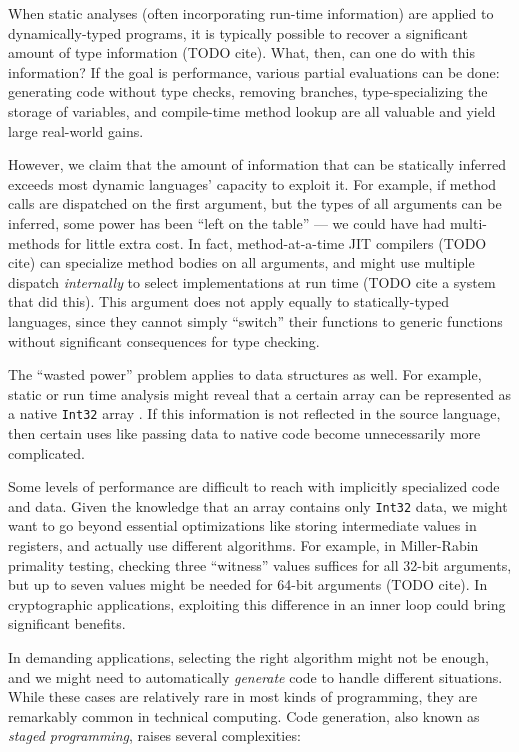 When static analyses (often incorporating run-time information) are applied
to dynamically-typed programs, it is typically possible to recover a
significant amount of type information (TODO cite). What, then, can one
do with this information? If the goal is performance, various partial
evaluations can be done: generating code without type checks, removing
branches, type-specializing the storage of variables, and compile-time
method lookup are all valuable and yield large real-world gains.

However, we claim that the amount of information that can be statically inferred
exceeds most dynamic languages' capacity to exploit it. For example,
if method calls are dispatched on the first argument, but the types of all
arguments can be inferred, some power has been ``left on the table'' ---
we could have had multi-methods for little extra cost. In fact, method-at-a-time
JIT compilers (TODO cite) can specialize method bodies on all arguments,
and might use multiple dispatch \emph{internally} to select implementations
at run time (TODO cite a system that did this). This argument does not
apply equally to statically-typed languages, since they cannot simply
``switch'' their functions to generic functions without significant
consequences for type checking.

The ``wasted power'' problem applies to data structures as well.
For example, static or run time analysis might reveal that a certain array
can be represented as a native \texttt{Int32} array \cite{Bolz2013}.
If this information is not reflected in the source language, then
certain uses like passing data to native code become unnecessarily more
complicated.

Some levels of performance are difficult to reach with implicitly
specialized code and data. Given the knowledge that
an array contains only \texttt{Int32} data, we might want to go
beyond essential optimizations like storing intermediate values in
registers, and actually use different algorithms. For example,
in Miller-Rabin primality testing, checking three ``witness'' values
suffices for all 32-bit arguments, but up to seven values might be
needed for 64-bit arguments (TODO cite).
In cryptographic applications, exploiting this difference in an inner loop
could bring significant benefits.

In demanding applications, selecting the right algorithm might not
be enough, and we might need to automatically \emph{generate} code
to handle different situations. While these cases are relatively rare
in most kinds of programming, they are remarkably common in technical
computing. Code generation, also known as \emph{staged programming},
raises several complexities:

